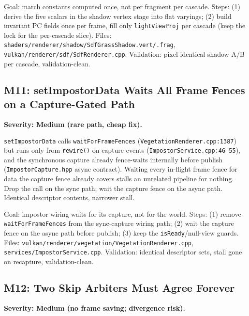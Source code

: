 \documentclass[11pt,a4paper]{article}
\begin{document}
\begin{tcolorbox}[promptbox={Prompt --- M10: flat shadow constants, hoisted PC}]
Goal: march constants computed once, not per fragment per cascade. Steps:
(1) derive the five scalars in the shadow vertex stage into flat varyings;
(2) build invariant PC fields once per frame, fill only
\texttt{lightViewProj} per cascade (keep the lock for the per-cascade
slice). Files: \texttt{shaders/renderer/shadow/SdfGrassShadow.vert/.frag},
\texttt{vulkan/renderer/sdf/SdfRenderer.cpp}. Validation: pixel-identical
shadow A/B per cascade, validation-clean.
\end{tcolorbox}

\subsection{M11: setImpostorData Waits All Frame Fences on a Capture-Gated Path}

\textbf{Severity: Medium (rare path, cheap fix).}

\texttt{setImpostorData} calls \texttt{waitForFrameFences}
(\texttt{VegetationRenderer.cpp:1387}) but runs only from
\texttt{rewire()} on capture events (\texttt{ImpostorService.cpp:46--55}),
and the synchronous capture already fence-waits internally before publish
(\texttt{ImpostorCapture.hpp} async contract). Waiting every in-flight
frame fence for data the capture fence already covers stalls an unrelated
pipeline for nothing. Drop the call on the sync path; wait the capture
fence on the async path. Identical descriptor contents, narrower stall.

\begin{tcolorbox}[promptbox={Prompt --- M11: narrow the impostor-data fence}]
Goal: impostor wiring waits for its capture, not for the world. Steps:
(1) remove \texttt{waitForFrameFences} from the sync-capture wiring path;
(2) wait the capture fence on the async path before publish; (3) keep the
\texttt{isReady}/null-view guards. Files:
\texttt{vulkan/renderer/vegetation/VegetationRenderer.cpp},
\texttt{services/ImpostorService.cpp}. Validation: identical descriptor
sets, stall gone on recapture, validation-clean.
\end{tcolorbox}

\subsection{M12: Two Skip Arbiters Must Agree Forever}

\textbf{Severity: Medium (no frame saving; divergence risk).}
\end{document}

